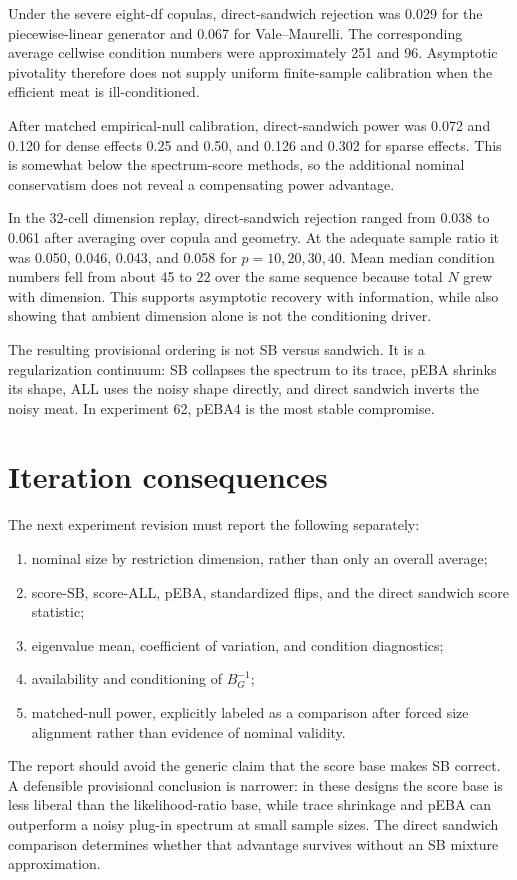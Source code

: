 \documentclass[11pt]{article}
\theoremstyle{plain}
\theoremstyle{remark}
\begin{document}
Under the severe eight-df copulas, direct-sandwich rejection was 0.029 for the
piecewise-linear generator and 0.067 for Vale--Maurelli. The corresponding
average cellwise condition numbers were approximately 251 and 96. Asymptotic
pivotality therefore does not supply uniform finite-sample calibration when the
efficient meat is ill-conditioned.

After matched empirical-null calibration, direct-sandwich power was 0.072 and
0.120 for dense effects 0.25 and 0.50, and 0.126 and 0.302 for sparse effects.
This is somewhat below the spectrum-score methods, so the additional nominal
conservatism does not reveal a compensating power advantage.

In the 32-cell dimension replay, direct-sandwich rejection ranged from 0.038 to
0.061 after averaging over copula and geometry. At the adequate sample ratio it
was 0.050, 0.046, 0.043, and 0.058 for $p=10,20,30,40$. Mean median condition
numbers fell from about 45 to 22 over the same sequence because total $N$ grew
with dimension. This supports asymptotic recovery with information, while also
showing that ambient dimension alone is not the conditioning driver.

The resulting provisional ordering is not SB versus sandwich. It is a
regularization continuum: SB collapses the spectrum to its trace, pEBA shrinks
its shape, ALL uses the noisy shape directly, and direct sandwich inverts the
noisy meat. In experiment 62, pEBA4 is the most stable compromise.

\section*{Iteration consequences}

The next experiment revision must report the following separately:
\begin{enumerate}
  \item nominal size by restriction dimension, rather than only an overall
        average;
  \item score-SB, score-ALL, pEBA, standardized flips, and the direct sandwich
        score statistic;
  \item eigenvalue mean, coefficient of variation, and condition diagnostics;
  \item availability and conditioning of $B_G^{-1}$;
  \item matched-null power, explicitly labeled as a comparison after forced
        size alignment rather than evidence of nominal validity.
\end{enumerate}

The report should avoid the generic claim that the score base makes SB correct.
A defensible provisional conclusion is narrower: in these designs the score
base is less liberal than the likelihood-ratio base, while trace shrinkage and
pEBA can outperform a noisy plug-in spectrum at small sample sizes. The direct
sandwich comparison determines whether that advantage survives without an SB
mixture approximation.
\end{document}
